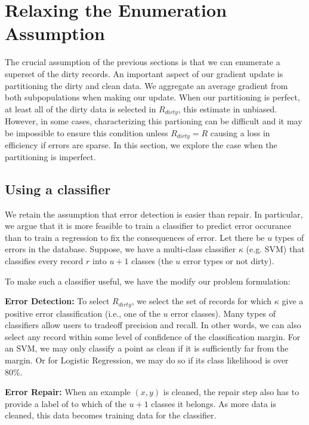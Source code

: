 \section{Relaxing the Enumeration Assumption}\label{imperfect}
The crucial assumption of the previous sections is that we can enumerate a superset of the dirty records.
An important aspect of our gradient update is partitioning the dirty and clean data.
We aggregate an average gradient from both subpopulations when making our update.
When our partitioning is perfect, at least all of the dirty data is selected in $R_{dirty}$, this estimate in unbiased.
However, in some cases, characterizing this partioning can be difficult and it may be impossible to ensure this condition unless $R_{dirty} = R$ causing a loss in efficiency if errors are sparse.  
In this section, we explore the case when the partitioning is imperfect.

\subsection{Using a classifier}
We retain the assumption that error detection is easier than repair.
In particular, we argue that it is more feasible to train a classifier to predict error occurance than to train a regression to fix the consequences of error.
Let there be $u$ types of errors in the database.
Suppose, we have a multi-class classifier $\kappa$ (e.g. SVM) that classifies every record $r$ into
$u+1$ classes (the $u$ error types or not dirty).

To make such a classifier useful, we have the modify our problem formulation:

\vspace{0.5em}

\noindent\textbf{Error Detection: } To select $R_{dirty}$, we select the set of records for which $\kappa$ give a positive error classification (i.e., one of the $u$ error classes).
Many types of classifiers allow users to tradeoff precision and recall.
In other words, we can also select any record within some level of confidence of the classification margin.
For an SVM, we may only classify a point as clean if it is sufficiently far from the margin.
Or for Logistic Regression, we may do so if its class likelihood is over 80\%.

\vspace{0.5em}

\noindent\textbf{Error Repair: } When an example $(x,y)$ is cleaned, the repair step also has to provide a label of to which of the $u+1$ classes it belongs. As more data is cleaned, this data becomes training data for the classifier.

